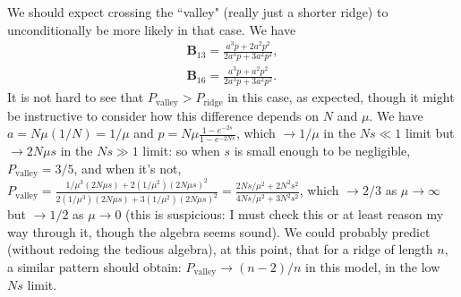 \documentclass[10pt]{revtex4}
\begin{document}
We should expect crossing the ``valley" (really just a shorter ridge) to unconditionally be more likely in that case.
We have
\begin{align}
\textbf{B}_{13} = \frac{a^3p + 2a^2p^2}{2a^3p+3a^2p^2}, \\
\textbf{B}_{16} = \frac{a^3p + a^2p^2}{2a^3p+3a^2p^2}.
\end{align}
It is not hard to see that $P_{\mathrm{valley}} > P_{\mathrm{ridge}}$ in this case, as expected, though it might be instructive to consider how this difference depends on $N$ and $\mu$.
We have $a = N\mu(1/N) = 1/\mu$ and $p = N\mu \frac{1 - e^{-2s}}{1-e^{-2Ns}}$, which $\to 1/\mu$ in the $Ns \ll 1$ limit but $\to 2N\mu s$ in the $Ns \gg 1$ limit: so when $s$ is small enough to be negligible, $P_\mathrm{valley} = 3/5$, and when it's not, $P_\mathrm{valley} = \frac{1/\mu^3(2N\mu s) + 2(1/\mu^2)(2N\mu s)^2}{2(1/\mu^3)(2N\mu s) + 3(1/\mu^2)(2N\mu s)^2} = \frac{2Ns/\mu^2 + 2N^2s^2}{4Ns/\mu^2 + 3N^2s^2}$, which $\to 2/3$ as $\mu \to \infty$ but $\to 1/2$ as $\mu \to 0$ (this is suspicious: I must check this or at least reason my way through it, though the algebra seems sound).
We could probably predict (without redoing the tedious algebra), at this point, that for a ridge of length $n$, a similar pattern should obtain: $P_\mathrm{valley} \to (n-2)/n$ in this model, in the low $Ns$ limit.
\end{document}
